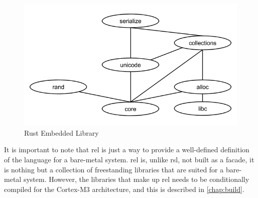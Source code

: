 \begin{figure}[H]
  \begin{center}
    \includegraphics[scale=0.3]{figures/background/rust/embedded-rust-lib.png}
  \end{center}
  \caption{Rust Embedded Library}
  \label{fig:rust:rel}
\end{figure}

It is important to note that \gls{rel} is just a way to provide a well-defined definition of the {\rust} language for a bare-metal system.
\gls{rel} is, unlike \gls{rsl}, not built as a facade, it is nothing but a collection of freestanding {\rust} libraries that are suited for a bare-metal system.
However, the libraries that make up \gls{rel} needs to be conditionally compiled for the Cortex-M3 architecture, and this is described in \autoref{chap:build}.
